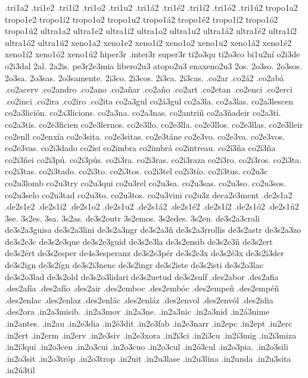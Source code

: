 {.tri1a2 .tri1e2 .tri1i2 .tri1o2 .tri1u2 .tri1á2 .tri1é2 .tri1í2 .tri1ó2 .tri1ú2
tropo1a2 tropo1e2 tropo1i2 tropo1o2 tropo1u2 tropo1á2 tropo1é2 tropo1í2 tropo1ó2 tropo1ú2
ultra1a2 ultra1e2 ultra1i2 ultra1o2 ultra1u2 ultra1á2 ultra1é2 ultra1í2 ultra1ó2 ultra1ú2
xeno1a2 xeno1e2 xeno1i2 xeno1o2 xeno1u2 xeno1á2 xeno1é2 xeno1í2 xeno1ó2 xeno1ú2
%
hiper3r .inter3r super3r
%
ti2o3qu ti2o3co bi1u2ní o2i3de o2i3dal 2al. 2a2is. pe3r2e3mia
%
libero2u3
atopo2u3
enaxeno2u3
%
2os. 2o3so. 2o3sos. 2o3sa. 2o3sas. 2o3samente.
2i3co. 2i3cos. 2i3ca. 2i3cas.
%
%
.co2ar
.co2á2
.co2abá
.co2acerv
.co2andro
.co2ano
.co2añar
.co2año
.co2art
.co2etan
.co2enci
.co2erci
.co2inci
.co2ira
.co2iro
.co2ita
%
co2a3gul
co2á3gul
co2a3la.
co2a3las.
co2a3lescen
co2a3lición.
co2a3licions.
co2a3na.
co2a3nas.
co2antriñ
co2a3ñadeir
co2a3tí.
co2a3tís.
co2e3ficien
co2e3lernos.
co2e3llo.
co2e3lla.
co2e3llos.
co2e3llas.
co2e3lleir
co2enll
co2enxía
co2e3sita.
co2e3sitas.
co2e3táne
co2e3vo.
co2e3va.
co2e3vos.
co2e3vas.
co2i3dado
co2iei
co2imbra
co2imbrá
co2intreau.
co2í3ña
co2i3ña
co2i3ñei
co2i3pú.
co2i3pús.
co2i3ra.
co2i3ras.
co2i3raza
co2i3ro.
co2i3ros.
co2i3ta.
co2i3tas.
co2i3tado.
co2i3to.
co2i3tos.
co2i3tel
co2i3tío.
co2i3tus.
co2u3c
co2u3lomb
co2u3try
co2u3qui
co2u3rel
co2u3sa.
co2u3sas.
co2u3so.
co2u3sos.
co2u3selo
co2u3tad
co2u3to.
co2u3tos.
co2u3vini
co2u3z
deca2e3ment
.de2s1a2 .de2s1e2 .de2s1i2 .de2s1o2 .de2s1u2 .de2s1á2 .de2s1é2 .de2s1í2 .de2s1ó2 .de2s1ú2
3se. 3s2es. 3sa. 3s2as. de3s2outr 3s2emos. 3s2edes. 3s2en.
%
de3s2a3crali
de3s2a3guisa
de3s2a3lini
de3s2a3ngr
de3s2a3ñ
de3s2a3rrollis
de3s2astr
de3s2a3zo
de3s2e3c
de3s2e3que
de3s2e3guid
de3s2e3la
de3s2ensib
de3s2e3ñ
de3s2ert
de3s2ért
de3s2esper de4s3esperanz
de3s2e3pér
de3s2e3x
de3s2é3x
de3s2i3der
de3s2ign
de3s2ígn
de3s2i3nenc
de3s2ingr
de3s2iste
de3s2isti
de3s2o3lac
de3s2o3lad
de3s2old
de3s2o3lidari
de3s2uetud
de3s2sulf
%
.des2abor
.des2afia
.des2afía
.des2afío
.des2air
.des2emboc
.des2embóc
.des2empeñ
.des2empéñ
.des2enlac
.des2enlaz
.des2enlác
.des2enláz
.des2envol
.des2envól
.des2idia
.des2ora
%
%
.in2a3misib.
.in2a3mov
.in2a3ne.
.in2a3nic
.in2a3nid
.in2á3nime
.in2antes.
.in2au
.in2e3dia
.in2é3dit
.in2e3fab
.in2e3narr
.in2epc
.in2ept
.in2erc
.in2ert
.in2erm
.in2erv
.in2e3siv
.in2e3xora
.in2i3ci
.in2i3cu
.in2i3mig
.in2i3miza
.in2i3qui
.in2o3cen
.in2o3cui
.in2o3cuo
.in2o3cul
.in2ó3cul
.in2o3pia.
.in2o3sili
.in2o3sit
.in2o3tróp
.in2o3trop
.in2uit
.in2u3lase
.in2u3lina
.in2unda
.in2u3sita
.in2ú3til
}
